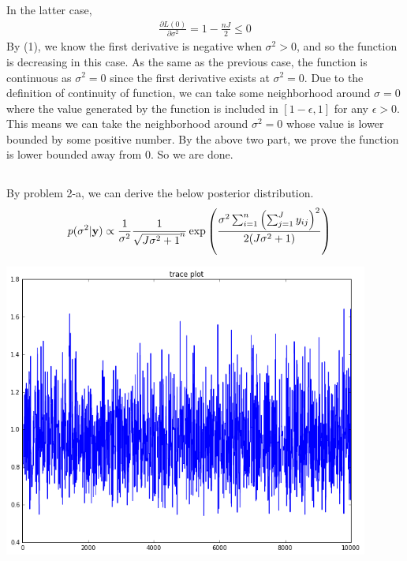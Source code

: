 \documentclass{article}
\begin{document}
		\par
		In the latter case, 
		\begin{align*}
			\frac{\partial L(0)}{\partial \sigma^2} = 1 - \frac{nJ}{2} \leq 0
		\end{align*}
		By (1), we know the first derivative is negative when $\sigma^2 > 0$, and so the function is decreasing in this case. As the same as the previous case, the function is continuous as $\sigma^2 = 0$ since the first derivative exists at $\sigma^2 = 0$. Due to the definition of continuity of function, we can take some neighborhood around $\sigma = 0$ where the value generated by the function is included in $[1 - \epsilon, 1]$  for any $\epsilon > 0$. This means we can take the neighborhood around $\sigma^2 = 0$ whose value is lower bounded by some positive number.
		By the above two part, we prove the function is lower bounded away from 0. So we are done.
	\subsection{}
	By problem 2-a, we can derive the below posterior distribution.
		\begin{align*}
		p(\sigma^2 | {\bf y}) &\propto \frac{1}{\sigma^2} \frac{1}{\sqrt{J\sigma^2 + 1}^n} \exp \left( \frac{\sigma^2 \sum_{i=1}^{n} \left( \sum_{j=1}^{J} y_{ij}\right)^2}{2(J\sigma^2+ 1)}\right)
		\end{align*}
		
		\begin{center}
		\includegraphics[width = 12cm]{2-c.png}
		\end{center}		
\end{document}
